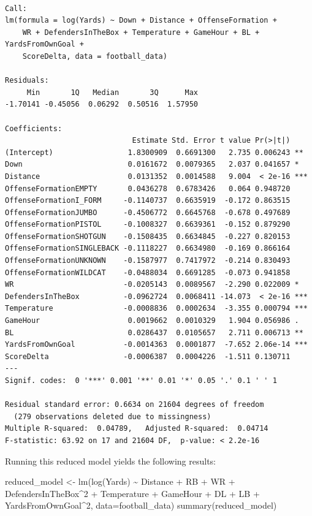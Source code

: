 \documentclass[
  super,
  preprint,
  3p]{elsarticle}
\newenvironment{Shaded}{\begin{snugshade}}{\end{snugshade}}
\newcommand{\AttributeTok}[1]{\textcolor[rgb]{0.40,0.45,0.13}{#1}}
\newcommand{\DecValTok}[1]{\textcolor[rgb]{0.68,0.00,0.00}{#1}}
\newcommand{\FunctionTok}[1]{\textcolor[rgb]{0.28,0.35,0.67}{#1}}
\newcommand{\NormalTok}[1]{\textcolor[rgb]{0.00,0.23,0.31}{#1}}
\newcommand{\OtherTok}[1]{\textcolor[rgb]{0.00,0.23,0.31}{#1}}
\newcommand{\SpecialCharTok}[1]{\textcolor[rgb]{0.37,0.37,0.37}{#1}}
\begin{document}
\begin{verbatim}

Call:
lm(formula = log(Yards) ~ Down + Distance + OffenseFormation + 
    WR + DefendersInTheBox + Temperature + GameHour + BL + YardsFromOwnGoal + 
    ScoreDelta, data = football_data)

Residuals:
     Min       1Q   Median       3Q      Max 
-1.70141 -0.45056  0.06292  0.50516  1.57950 

Coefficients:
                             Estimate Std. Error t value Pr(>|t|)    
(Intercept)                 1.8300909  0.6691300   2.735 0.006243 ** 
Down                        0.0161672  0.0079365   2.037 0.041657 *  
Distance                    0.0131352  0.0014588   9.004  < 2e-16 ***
OffenseFormationEMPTY       0.0436278  0.6783426   0.064 0.948720    
OffenseFormationI_FORM     -0.1140737  0.6635919  -0.172 0.863515    
OffenseFormationJUMBO      -0.4506772  0.6645768  -0.678 0.497689    
OffenseFormationPISTOL     -0.1008327  0.6639361  -0.152 0.879290    
OffenseFormationSHOTGUN    -0.1508435  0.6634845  -0.227 0.820153    
OffenseFormationSINGLEBACK -0.1118227  0.6634980  -0.169 0.866164    
OffenseFormationUNKNOWN    -0.1587977  0.7417972  -0.214 0.830493    
OffenseFormationWILDCAT    -0.0488034  0.6691285  -0.073 0.941858    
WR                         -0.0205143  0.0089567  -2.290 0.022009 *  
DefendersInTheBox          -0.0962724  0.0068411 -14.073  < 2e-16 ***
Temperature                -0.0008836  0.0002634  -3.355 0.000794 ***
GameHour                    0.0019662  0.0010329   1.904 0.056986 .  
BL                          0.0286437  0.0105657   2.711 0.006713 ** 
YardsFromOwnGoal           -0.0014363  0.0001877  -7.652 2.06e-14 ***
ScoreDelta                 -0.0006387  0.0004226  -1.511 0.130711    
---
Signif. codes:  0 '***' 0.001 '**' 0.01 '*' 0.05 '.' 0.1 ' ' 1

Residual standard error: 0.6634 on 21604 degrees of freedom
  (279 observations deleted due to missingness)
Multiple R-squared:  0.04789,   Adjusted R-squared:  0.04714 
F-statistic: 63.92 on 17 and 21604 DF,  p-value: < 2.2e-16
\end{verbatim}

Running this reduced model yields the following results:

\begin{Shaded}
\begin{Highlighting}[]
\NormalTok{reduced\_model }\OtherTok{\textless{}{-}} \FunctionTok{lm}\NormalTok{(}\FunctionTok{log}\NormalTok{(Yards) }\SpecialCharTok{\textasciitilde{}}\NormalTok{ Distance }\SpecialCharTok{+}\NormalTok{ RB }\SpecialCharTok{+}\NormalTok{ WR }\SpecialCharTok{+}\NormalTok{ DefendersInTheBox}\SpecialCharTok{\^{}}\DecValTok{2} \SpecialCharTok{+}\NormalTok{ Temperature }\SpecialCharTok{+}\NormalTok{ GameHour }\SpecialCharTok{+}\NormalTok{ DL }\SpecialCharTok{+}\NormalTok{ LB }\SpecialCharTok{+}\NormalTok{ YardsFromOwnGoal}\SpecialCharTok{\^{}}\DecValTok{2}\NormalTok{, }\AttributeTok{data=}\NormalTok{football\_data)}
\FunctionTok{summary}\NormalTok{(reduced\_model)}
\end{Highlighting}
\end{Shaded}
\end{document}
